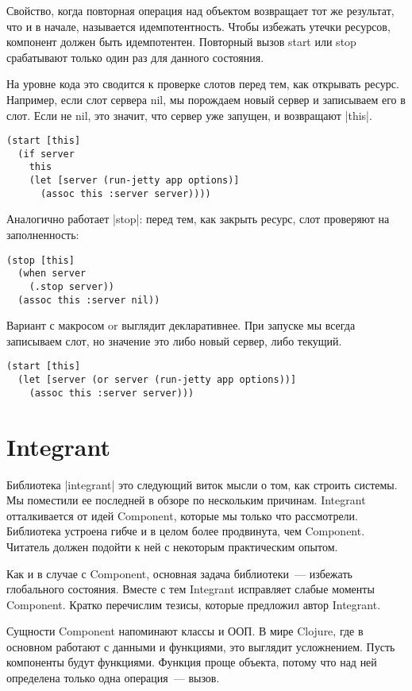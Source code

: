 Свойство, когда повторная операция над объектом возвращает тот же результат, что
и в начале, называется идемпотентность. Чтобы избежать утечки ресурсов,
компонент должен быть идемпотентен. Повторный вызов start или stop срабатывают
только один раз для данного состояния.

На уровне кода это сводится к проверке слотов перед тем, как открывать
ресурс. Например, если слот сервера nil, мы порождаем новый сервер и записываем
его в слот. Если не nil, это значит, что сервер уже запущен, и возвращают
\spverb|this|.

\begin{verbatim}
(start [this]
  (if server
    this
    (let [server (run-jetty app options)]
      (assoc this :server server))))
\end{verbatim}

Аналогично работает \spverb|stop|: перед тем, как закрыть ресурс, слот проверяют на
заполненность:

\begin{verbatim}
(stop [this]
  (when server
    (.stop server))
  (assoc this :server nil))
\end{verbatim}

Вариант с макросом or выглядит декларативнее. При запуске мы всегда записываем
слот, но значение это либо новый сервер, либо текущий.

\begin{verbatim}
(start [this]
  (let [server (or server (run-jetty app options))]
    (assoc this :server server)))
\end{verbatim}

\section{Integrant}

Библиотека \spverb|integrant|
это следующий виток мысли о том, как строить системы. Мы поместили ее последней
в обзоре по нескольким причинам. Integrant отталкивается от идей Component,
которые мы только что рассмотрели. Библиотека устроена гибче и в целом более
продвинута, чем Component. Читатель должен подойти к ней с некоторым
практическим опытом.

Как и в случае с Component, основная задача библиотеки~--- избежать глобального
состояния. Вместе с тем Integrant исправляет слабые моменты Component. Кратко
перечислим тезисы, которые предложил автор Integrant.

Сущности Component напоминают классы и ООП. В мире Clojure, где в основном
работают с данными и функциями, это выглядит усложнением. Пусть компоненты будут
функциями. Функция проще объекта, потому что над ней определена только одна
операция~--- вызов.


